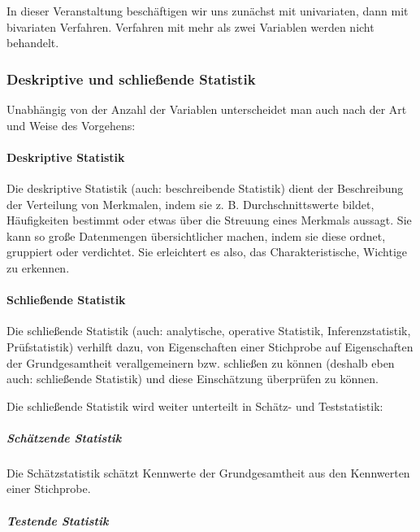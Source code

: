 \documentclass[
  11pt,
  ngerman,
  a4paper,
]{report}
\begin{document}
In dieser Veranstaltung beschäftigen wir uns zunächst mit univariaten, dann mit bivariaten Verfahren. Verfahren mit mehr als zwei Variablen werden nicht behandelt.

\hypertarget{deskriptive-und-schlieuxdfende-statistik}{%
\subsubsection{Deskriptive und schließende Statistik}\label{deskriptive-und-schlieuxdfende-statistik}}

Unabhängig von der Anzahl der Variablen unterscheidet man auch nach der Art und Weise des Vorgehens:

\hypertarget{deskriptive-statistik}{%
\paragraph{Deskriptive Statistik}\label{deskriptive-statistik}}

Die deskriptive Statistik (auch: beschreibende Statistik) dient der Beschreibung der Verteilung von Merkmalen, indem sie z. B. Durchschnittswerte bildet, Häufigkeiten bestimmt oder etwas über die Streuung eines Merkmals aussagt. Sie kann so große Datenmengen übersichtlicher machen, indem sie diese ordnet, gruppiert oder verdichtet. Sie erleichtert es also, das Charakteristische, Wichtige zu erkennen.

\hypertarget{schlieuxdfende-statistik}{%
\paragraph{Schließende Statistik}\label{schlieuxdfende-statistik}}

Die schließende Statistik (auch: analytische, operative Statistik, Inferenzstatistik, Prüfstatistik) verhilft dazu, von Eigenschaften einer Stichprobe auf Eigenschaften der Grundgesamtheit verallgemeinern bzw. schließen zu können (deshalb eben auch: schließende Statistik) und diese Einschätzung überprüfen zu können.

Die schließende Statistik wird weiter unterteilt in Schätz- und Teststatistik:

\hypertarget{schuxe4tzende-statistik}{%
\subparagraph{Schätzende Statistik}\label{schuxe4tzende-statistik}}

Die Schätzstatistik schätzt Kennwerte der Grundgesamtheit aus den Kennwerten einer Stichprobe.

\hypertarget{testende-statistik}{%
\subparagraph{Testende Statistik}\label{testende-statistik}}
\end{document}
